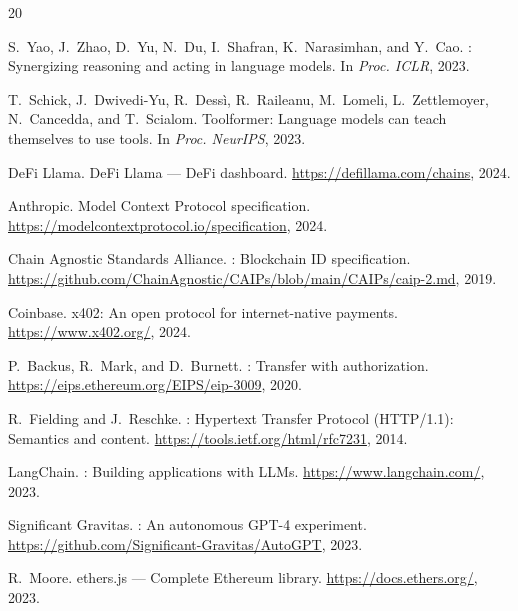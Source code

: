 \documentclass[11pt]{article}
\begin{document}
\begin{thebibliography}{20}

S.~Yao, J.~Zhao, D.~Yu, N.~Du, I.~Shafran, K.~Narasimhan, and Y.~Cao.
: Synergizing reasoning and acting in language models.
\newblock In \emph{Proc. ICLR}, 2023.

T.~Schick, J.~Dwivedi-Yu, R.~Dess\`{i}, R.~Raileanu, M.~Lomeli, L.~Zettlemoyer, N.~Cancedda, and T.~Scialom.
\newblock Toolformer: Language models can teach themselves to use tools.
\newblock In \emph{Proc. NeurIPS}, 2023.

{DeFi Llama}.
\newblock DeFi Llama --- DeFi dashboard.
\newblock \url{https://defillama.com/chains}, 2024.

Anthropic.
\newblock Model Context Protocol specification.
\newblock \url{https://modelcontextprotocol.io/specification}, 2024.

{Chain Agnostic Standards Alliance}.
: Blockchain ID specification.
\newblock \url{https://github.com/ChainAgnostic/CAIPs/blob/main/CAIPs/caip-2.md}, 2019.

Coinbase.
\newblock x402: An open protocol for internet-native payments.
\newblock \url{https://www.x402.org/}, 2024.

P.~Backus, R.~Mark, and D.~Burnett.
: Transfer with authorization.
\newblock \url{https://eips.ethereum.org/EIPS/eip-3009}, 2020.

R.~Fielding and J.~Reschke.
: Hypertext Transfer Protocol ({HTTP}/1.1): Semantics and content.
\newblock \url{https://tools.ietf.org/html/rfc7231}, 2014.

{LangChain}.
: Building applications with LLMs.
\newblock \url{https://www.langchain.com/}, 2023.

{Significant Gravitas}.
: An autonomous GPT-4 experiment.
\newblock \url{https://github.com/Significant-Gravitas/AutoGPT}, 2023.

R.~Moore.
\newblock ethers.js --- Complete Ethereum library.
\newblock \url{https://docs.ethers.org/}, 2023.


\end{thebibliography}
\end{document}
